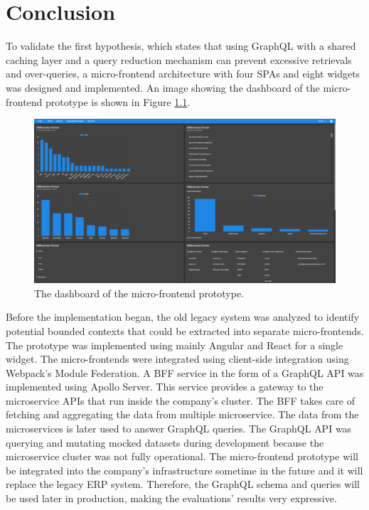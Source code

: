 \chapter{Conclusion}\label{chapter:conclusion}

\noindent To validate the first hypothesis, which states that using GraphQL with a shared caching layer and a query reduction mechanism can prevent excessive retrievals and over-queries, a micro-frontend architecture with four \acp{SPA} and eight widgets was designed and implemented. An image showing the dashboard of the micro-frontend prototype is shown in Figure \ref{fig:conclusion:ui-dashboard}.

\ifshowImages
\begin{figure}[H]
  \centering
  \includegraphics[width=1\linewidth]{images/prototype-screenshots/ui-dashboard.png}
  \caption{The dashboard of the micro-frontend prototype.}\label{fig:conclusion:ui-dashboard}
\end{figure}
\fi

\noindent Before the implementation began, the old legacy system was analyzed to identify potential bounded contexts that could be extracted into separate micro-frontends. The prototype was implemented using mainly Angular and React for a single widget. The micro-frontends were integrated using client-side integration using Webpack's Module Federation. A \ac{BFF} service in the form of a GraphQL \ac{API} was implemented using Apollo Server. This service provides a gateway to the microservice \acp{API} that run inside the company's cluster. The \ac{BFF} takes care of fetching and aggregating the data from multiple microservice. The data from the microservices is later used to answer GraphQL queries. The GraphQL \ac{API} was querying and mutating mocked datasets during development because the microservice cluster was not fully operational. The micro-frontend prototype will be integrated into the company's infrastructure sometime in the future and it will replace the legacy \ac{ERP} system. Therefore, the GraphQL schema and queries will be used later in production, making the evaluations' results very expressive.

